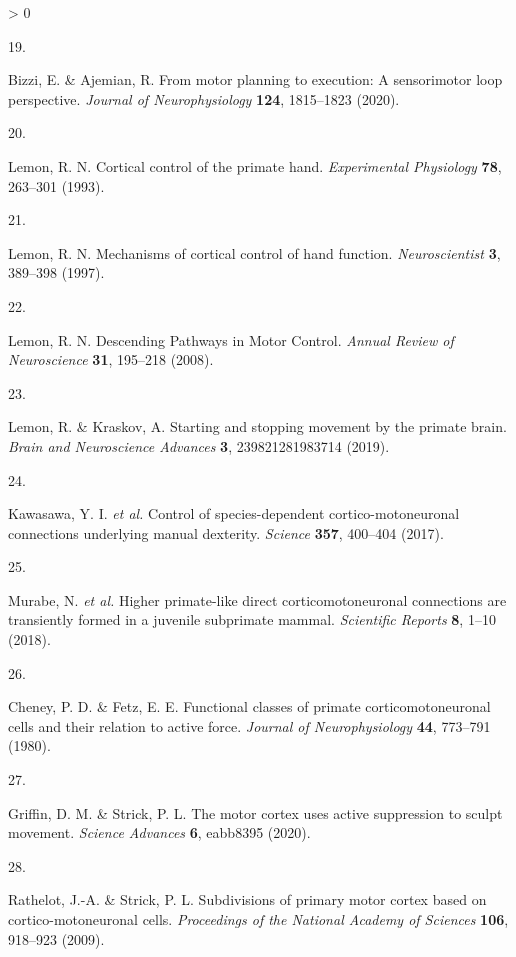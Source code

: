 \documentclass[
  a4paper,
]{article}
\newlength{\cslhangindent}
\newlength{\csllabelwidth}
\newenvironment{CSLReferences}[2] %
 {%
  \setlength{\parindent}{0pt}
  \ifodd #1 \everypar{\setlength{\hangindent}{\cslhangindent}}\ignorespaces\fi
  \ifnum #2 > 0
  \setlength{\parskip}{#2\baselineskip}
  \fi
 }%
 {}
\newcommand{\CSLLeftMargin}[1]{\parbox[t]{\csllabelwidth}{#1}}
\newcommand{\CSLRightInline}[1]{\parbox[t]{\linewidth - \csllabelwidth}{#1}\break}
\begin{document}
\begin{CSLReferences}{0}{0}
\leavevmode\hypertarget{ref-bizziMotorPlanningExecution2020}{}%
\CSLLeftMargin{19. }
\CSLRightInline{Bizzi, E. \& Ajemian, R. From motor planning to
execution: A sensorimotor loop perspective. \emph{Journal of
Neurophysiology} \textbf{124}, 1815--1823 (2020).}

\leavevmode\hypertarget{ref-lemon1993}{}%
\CSLLeftMargin{20. }
\CSLRightInline{Lemon, R. N. Cortical control of the primate hand.
\emph{Experimental Physiology} \textbf{78}, 263--301 (1993).}

\leavevmode\hypertarget{ref-lemon1997}{}%
\CSLLeftMargin{21. }
\CSLRightInline{Lemon, R. N. Mechanisms of cortical control of hand
function. \emph{Neuroscientist} \textbf{3}, 389--398 (1997).}

\leavevmode\hypertarget{ref-lemon2008}{}%
\CSLLeftMargin{22. }
\CSLRightInline{Lemon, R. N. Descending {Pathways} in {Motor Control}.
\emph{Annual Review of Neuroscience} \textbf{31}, 195--218 (2008).}

\leavevmode\hypertarget{ref-lemonStartingStoppingMovement2019}{}%
\CSLLeftMargin{23. }
\CSLRightInline{Lemon, R. \& Kraskov, A. Starting and stopping movement
by the primate brain. \emph{Brain and Neuroscience Advances} \textbf{3},
239821281983714 (2019).}

\leavevmode\hypertarget{ref-kawasawa2017}{}%
\CSLLeftMargin{24. }
\CSLRightInline{Kawasawa, Y. I. \emph{et al.} Control of
species-dependent cortico-motoneuronal connections underlying manual
dexterity. \emph{Science} \textbf{357}, 400--404 (2017).}

\leavevmode\hypertarget{ref-murabe2018}{}%
\CSLLeftMargin{25. }
\CSLRightInline{Murabe, N. \emph{et al.} Higher primate-like direct
corticomotoneuronal connections are transiently formed in a juvenile
subprimate mammal. \emph{Scientific Reports} \textbf{8}, 1--10 (2018).}

\leavevmode\hypertarget{ref-cheneyFunctionalClassesPrimate1980}{}%
\CSLLeftMargin{26. }
\CSLRightInline{Cheney, P. D. \& Fetz, E. E. Functional classes of
primate corticomotoneuronal cells and their relation to active force.
\emph{Journal of Neurophysiology} \textbf{44}, 773--791 (1980).}

\leavevmode\hypertarget{ref-griffinMotorCortexUses2020}{}%
\CSLLeftMargin{27. }
\CSLRightInline{Griffin, D. M. \& Strick, P. L. The motor cortex uses
active suppression to sculpt movement. \emph{Science Advances}
\textbf{6}, eabb8395 (2020).}

\leavevmode\hypertarget{ref-Rathelot2009}{}%
\CSLLeftMargin{28. }
\CSLRightInline{Rathelot, J.-A. \& Strick, P. L. Subdivisions of primary
motor cortex based on cortico-motoneuronal cells. \emph{Proceedings of
the National Academy of Sciences} \textbf{106}, 918--923 (2009).}


\end{CSLReferences}
\end{document}
